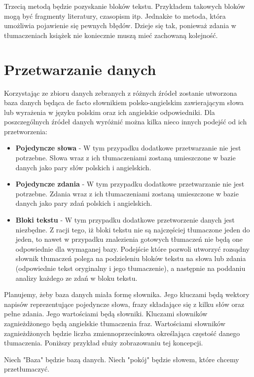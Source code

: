 \documentclass[12pt]{article}
\begin{document}
Trzecią metodą będzie pozyskanie bloków tekstu. Przykładem takowych bloków mogą być fragmenty literatury, czasopism itp. Jednakże to metoda, która umożliwia pojawienie się pewnych błędów. Dzieje się tak, ponieważ zdania w tłumaczeniach książek nie koniecznie muszą mieć zachowaną kolejność.  

\section{Przetwarzanie danych}
Korzystając ze zbioru danych zebranych z różnych źródeł zostanie utworzona baza danych będąca de facto słownikiem polsko-angielskim zawierającym słowa lub wyrażenia w języku polskim oraz ich angielskie odpowiedniki. Dla poszczególnych źródeł danych wyróżnić można kilka nieco innych podejść od ich przetworzenia:
\begin{itemize}
  \item \textbf{Pojedyncze słowa} - W tym przypadku dodatkowe przetwarzanie nie jest potrzebne. Słowa wraz z ich tłumaczeniami zostaną umieszczone w bazie danych jako pary słów polskich i angielskich.
  \item \textbf{Pojedyncze zdania} - W tym przypadku dodatkowe przetwarzanie nie jest potrzebne. Zdania wraz z ich tłumaczeniami zostaną umieszczone w bazie danych jako pary zdań polskich i angielskich.
  \item \textbf{Bloki tekstu} - W tym przypadku dodatkowe przetworzenie danych jest niezbędne. Z racji tego, iż bloki tekstu nie są najczęściej tłumaczone jeden do jeden, to nawet w przypadku znalezienia gotowych tłumaczeń nie będą one odpowiednie dla wymaganej bazy. Podejście które pozwoli utworzyć rozsądny słownik tłumaczeń polega na podzieleniu bloków tekstu na słowa lub zdania (odpowiednie tekst oryginalny i jego tłumaczenie), a następnie na poddaniu analizy każdego ze zdań w bloku tekstu.
\end{itemize}

Planujemy, żeby baza danych miała formę słownika. Jego kluczami będą wektory napisów reprezentujące pojedyncze słowa, frazy składające się z kilku słów oraz pełne zdania. Jego wartościami będą słowniki. Kluczami słowników zagnieżdżonego będą angielskie tłumaczenia fraz. Wartościami słowników zagnieżdżonych będzie liczba zmiennoprzecinkowa określająca częstość danego tłumaczenia. Poniższy przykład służy zobrazowaniu tej koncepcji.

\newpage
Niech "Baza" będzie bazą danych. Niech "pokój" będzie słowem, które chcemy przetłumaczyć. 
\end{document}
